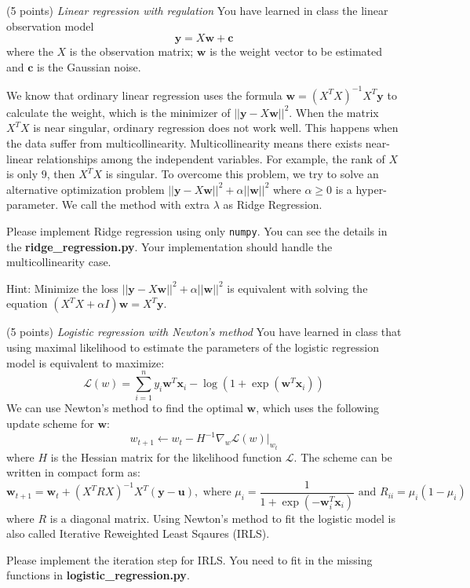 \documentclass[a4paper, 12pt]{exam}
\begin{document}
\begin{questions}
\question (5 points) \emph{Linear regression with regulation} You have learned in class the linear observation model
\begin{equation*}
\bm{y} = X\bm{w} + \bm{c}
\end{equation*}
where the $X$ is the observation matrix;
$\bm{w}$ is the weight vector to be estimated and $\bm{c}$ is the Gaussian noise.

We know that ordinary linear regression uses the formula $\bm{w} = (X^TX)^{-1}X^T\bm{y}$ to calculate the weight, which is the minimizer
of $||\bm{y} - X\bm{w}||^2$.
When the matrix $X^TX$ is near singular, ordinary regression does not work well. This happens when
the data suffer from multicollinearity. Multicollinearity means there exists near-linear relationships among the independent variables.
For example, the rank of $X$ is only $9$, then $X^TX$ is singular. To overcome this problem, we try to solve an alternative optimization problem
$||\bm{y} - X\bm{w}||^2 + \alpha ||\bm{w}||^2$ where $\alpha \geq 0$ is a hyper-parameter. We call the method with extra $\lambda$ as Ridge Regression.

Please implement Ridge regression using only \texttt{numpy}. You can see the details in the \textbf{ridge\_regression.py}.
Your implementation should handle the multicollinearity case.

Hint: Minimize the loss $||\bm{y} - X\bm{w}||^2 + \alpha ||\bm{w}||^2$ is equivalent with solving the equation
$( X^T X+ \alpha I)\bm{w}  = X^T \bm{y}$.

\question (5 points) \emph{Logistic regression with Newton's method} You have learned in class that using maximal likelihood to estimate the parameters of the logistic regression model is equivalent to maximize:
\begin{equation*}
\mathcal{L}(w) = \sum_{i=1}^n y_i \bm{w}^T \bm{x}_i - \log ( 1 + \exp(\bm{w}^T \bm{x}_i))
\end{equation*}
We can use Newton's method to find the optimal $\bm{w}$, which uses the following update scheme for $\bm{w}$:
\begin{equation*}
w_{t+1} \leftarrow w_t - H^{-1} \nabla_w \mathcal{L}(w)|_{w_t}
\end{equation*}
where $H$ is the Hessian matrix for the likelihood function $\mathcal{L}$.
The scheme can be written in compact form as:
\begin{equation*}
\bm{w}_{t+1} = \bm{w}_t + (X^TRX)^{-1} X^T(\bm{y}-\bm{u}), \textrm{ where } \mu_i = \frac{1}{1+\exp(-\bm{w}_i^T\bm{x}_i)} \textrm{ and } R_{ii} = \mu_i ( 1 - \mu_i)
\end{equation*}
where $R$ is a diagonal matrix. Using Newton's method to fit the logistic model is also called Iterative Reweighted Least Sqaures (IRLS).

Please implement the iteration step for IRLS. You need to fit in the missing functions in \textbf{logistic\_regression.py}.

\end{questions}
\end{document}
